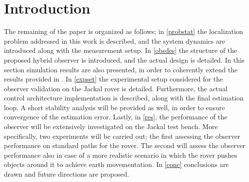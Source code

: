 \section{Introduction}
\label{intro}

The remaining of the paper is organized as follows; in \ref{probstat} the localization problem addressed in this work is described, and the system dynamics are introduced along with the measurement setup. In \ref{obsdes} the structure of the proposed hybrid observer is introduced, and the actual design is detailed. In this section simulation results are also presented, in order to coherently extend the results provided in \cite{Oliva03}. In \ref{expset} the experimental setup considered for the observer validation on the Jackal rover is detailed. Furthermore, the actual control architecture implementation is described, along with the final estimation loop. A short stability analysis will be provided as well, in order to ensure convergence of the estimation error. Lastly, in \ref{res}, the performance of the observer will be extensively investigated on the Jackal test bench. More specifically, two experiments will be carried out; the first assessing the observer performance on standard paths for the rover. The second will assess the observer performance also in case of a more realistic scenario in which the rover pushes objects around it to achieve earth movementation. In \ref{conc} conclusions are drawn and future directions are proposed.

